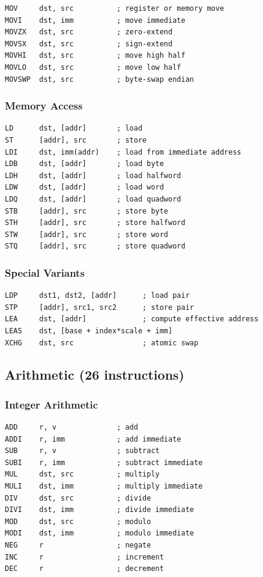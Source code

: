 \documentclass[12pt]{article}
\begin{document}
\begin{lstlisting}
MOV     dst, src          ; register or memory move
MOVI    dst, imm          ; move immediate
MOVZX   dst, src          ; zero-extend
MOVSX   dst, src          ; sign-extend
MOVHI   dst, src          ; move high half
MOVLO   dst, src          ; move low half
MOVSWP  dst, src          ; byte-swap endian
\end{lstlisting}

\subsubsection{Memory Access}

\begin{lstlisting}
LD      dst, [addr]       ; load
ST      [addr], src       ; store
LDI     dst, imm(addr)    ; load from immediate address
LDB     dst, [addr]       ; load byte
LDH     dst, [addr]       ; load halfword
LDW     dst, [addr]       ; load word
LDQ     dst, [addr]       ; load quadword
STB     [addr], src       ; store byte
STH     [addr], src       ; store halfword
STW     [addr], src       ; store word
STQ     [addr], src       ; store quadword
\end{lstlisting}

\subsubsection{Special Variants}

\begin{lstlisting}
LDP     dst1, dst2, [addr]      ; load pair
STP     [addr], src1, src2      ; store pair
LEA     dst, [addr]             ; compute effective address
LEAS    dst, [base + index*scale + imm]
XCHG    dst, src                ; atomic swap
\end{lstlisting}

\subsection{Arithmetic (26 instructions)}

\subsubsection{Integer Arithmetic}

\begin{lstlisting}
ADD     r, v              ; add
ADDI    r, imm            ; add immediate
SUB     r, v              ; subtract
SUBI    r, imm            ; subtract immediate
MUL     dst, src          ; multiply
MULI    dst, imm          ; multiply immediate
DIV     dst, src          ; divide
DIVI    dst, imm          ; divide immediate
MOD     dst, src          ; modulo
MODI    dst, imm          ; modulo immediate
NEG     r                 ; negate
INC     r                 ; increment
DEC     r                 ; decrement
\end{lstlisting}
\end{document}
